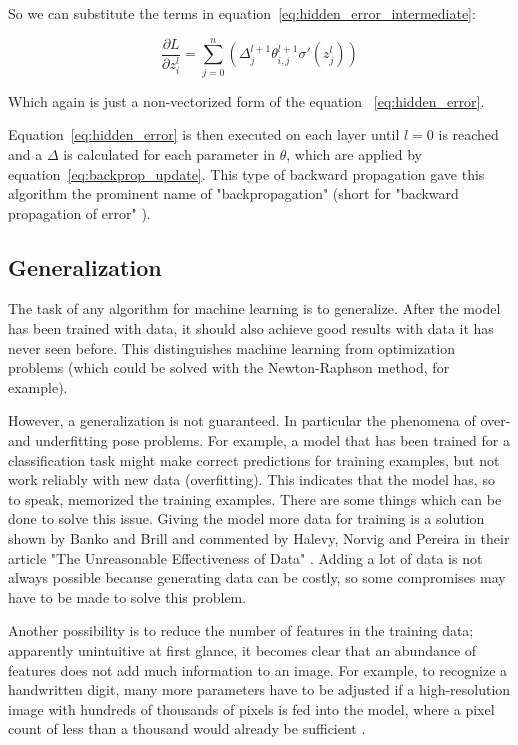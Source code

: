So we can substitute the terms in equation~\eqref{eq:hidden_error_intermediate}:

\begin{equation}
    \frac{\partial L}{\partial z^l_i} = \sum_{j=0}^n (\varDelta^{l+1}_j \theta^{l+1}_{i,j} \sigma'(z_j^l))
\end{equation}

Which again is just a non-vectorized form of the equation ~\eqref{eq:hidden_error}.

Equation~\eqref{eq:hidden_error} is then executed on each layer until $l=0$ is reached and a $\varDelta$ is calculated for each parameter in $\theta$, which are applied by equation~\eqref{eq:backprop_update}.
This type of backward propagation gave this algorithm the prominent name of "backpropagation" (short for "backward propagation of error" \cite{Rumelhart1986}).

\subsection{Generalization}

The task of any algorithm for machine learning is to generalize.
After the model has been trained with data, it should also achieve good results with data it has never seen before.
This distinguishes machine learning from optimization problems (which could be solved with the Newton-Raphson method, for example).

However, a generalization is not guaranteed. In particular the phenomena of over- and underfitting  pose problems.
For example, a model that has been trained for a classification task might make correct predictions for training examples, but not work reliably with new data (overfitting).
This indicates that the model has, so to speak, memorized the training examples.
There are some things which can be done to solve this issue.
Giving the model more data for training is a solution shown by Banko and Brill \cite {Banko2001} and commented by Halevy, Norvig and Pereira in their article "The Unreasonable Effectiveness of Data" \cite{Halevy2009}.
Adding a lot of data is not always possible because generating data can be costly, so some compromises may have to be made to solve this problem.

Another possibility is to reduce the number of features in the training data; apparently unintuitive at first glance, it becomes clear that an abundance of features does not add much information to an image. For example, to recognize a handwritten digit, many more parameters have to be adjusted if a high-resolution image with hundreds of thousands of pixels is fed into the model, where a pixel count of less than a thousand would already be sufficient \cite{Nielsen2015}.

